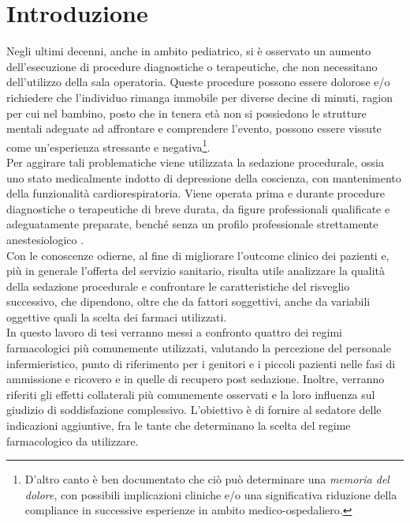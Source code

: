 \chapter{Introduzione}


Negli ultimi decenni, anche in ambito pediatrico, si è osservato un aumento dell'esecuzione di procedure diagnostiche o terapeutiche, che non necessitano dell'utilizzo della sala operatoria. Queste procedure possono essere dolorose e/o richiedere che l'individuo rimanga immobile per diverse decine di minuti, ragion per cui nel bambino, posto che in tenera età non si possiedono le strutture mentali adeguate ad affrontare e comprendere l'evento, possono essere vissute come un'esperienza stressante e negativa\footnote{D'altro canto è ben documentato \cite{Memoriadolorechir, Memoriadol2004, Memoryforpain1999} che ciò può determinare una \emph{memoria del dolore}, con possibili implicazioni cliniche e/o una significativa riduzione della compliance in successive esperienze in ambito medico-ospedaliero.}.
\\Per aggirare tali problematiche viene utilizzata la sedazione procedurale, ossia uno stato medicalmente indotto di depressione della coscienza, con mantenimento della funzionalità cardiorespiratoria. Viene operata prima e durante procedure diagnostiche o terapeutiche di breve durata, da figure professionali qualificate e adeguatamente preparate, benché senza un profilo professionale strettamente anestesiologico \cite{Krauss2006, Simeupsedazione}. 
\\Con le conoscenze odierne, al fine di migliorare l'outcome clinico dei pazienti e, più in generale l'offerta del servizio sanitario, risulta utile analizzare la qualità della sedazione procedurale e confrontare le caratteristiche del risveglio successivo, che dipendono, oltre che da fattori soggettivi, anche da variabili oggettive quali la scelta dei farmaci utilizzati. 
\\In questo lavoro di tesi verranno messi a confronto quattro dei regimi farmacologici più comunemente utilizzati, valutando la percezione del personale infermieristico, punto di riferimento per i genitori e i piccoli pazienti nelle fasi di ammissione e ricovero e in quelle di recupero post sedazione. Inoltre, verranno riferiti gli effetti collaterali più comunemente osservati e la loro influenza sul giudizio di soddisfazione complessivo. L'obiettivo è di fornire al sedatore delle indicazioni aggiuntive, fra le tante che determinano la scelta del regime farmacologico da utilizzare.



